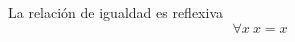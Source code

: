 \begin{axiom} \label{eq_reflexive} La relación de igualdad es reflexiva
	\begin{equation}
		\forall x\ x=x
	\end{equation}
\end{axiom}
